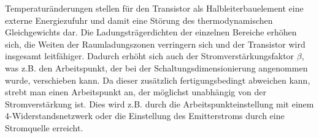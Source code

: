 Temperaturänderungen stellen für den Transistor als Halbleiterbauelement eine
externe Energiezufuhr und damit eine Störung des thermodynamischen
Gleichgewichts dar. Die Ladungsträgerdichten der einzelnen Bereiche
erhöhen sich, die Weiten der Raumladungszonen verringern sich und der Transistor
wird insgesamt leitfähiger. Dadurch erhöht sich auch der
Stromverstärkungsfaktor $\beta$, was z.B. den Arbeitspunkt, der bei der
Schaltungsdimensionierung angenommen wurde, verschieben kann. Da dieser zusätzlich
fertigungsbedingt abweichen kann, strebt man einen
Arbeitspunkt an, der möglichst unabhängig von der Stromverstärkung ist. Dies
wird z.B. durch die Arbeitspunkteinstellung mit einem 4-Widerstandsnetzwerk oder
die Einstellung des Emitterstroms durch eine Stromquelle erreicht.

